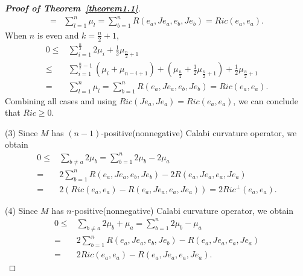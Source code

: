 \documentclass{amsart}
\theoremstyle{definition}
\theoremstyle{remark}
\numberwithin{equation}{section}
\begin{document}
\begin{proof}[{\bf Proof of Theorem~\ref{theorem1.1}}]
\begin{align*}
 = & \sum\limits_{l = 1}^n {{\mu _l}}  = \sum\limits_{b = 1}^n {R\left( {{e_a},J{e_a},{e_b},J{e_b}} \right)}
 =  Ric\left( {{e_a},{e_a}} \right).
\end{align*}
When $n$ is even and $k = \frac{n}{2}+1$,
\begin{align*}
0 \le & \sum\limits_{i = 1}^{\frac{n}{2}} {2{\mu _i}}  + \frac{1}{2}{\mu _{\frac{n}{2} + 1}}\\
 \le & \sum\limits_{i = 1}^{\frac{n}{2} - 1} {\left( {{\mu _i} + {\mu _{n - i + 1}}} \right)}  + \left( {{\mu _{\frac{n}{2}}} + \frac{1}{2}{\mu _{\frac{n}{2} + 1}}} \right) + \frac{1}{2}{\mu _{\frac{n}{2} + 1}}\\
 = & \sum\limits_{l = 1}^n {{\mu _l}}  = \sum\limits_{b = 1}^n {R\left( {{e_a},J{e_a},{e_b},J{e_b}} \right)}
 =  Ric\left( {{e_a},{e_a}} \right).
\end{align*}
Combining all cases and using   $Ric\left( {J{e_a},J{e_a}} \right) = Ric\left( {{e_a},{e_a}} \right)$, we can conclude that $Ric \ge 0$.

(3) Since $M$ has $\left( n-1 \right)$-positive(nonnegative) Calabi curvature operator, we obtain
\begin{align*}
0 \le & \sum\limits_{b \ne a}^{} {2{\mu _b}}
 = \sum\limits_{b = 1}^n {2{\mu _b}}  - 2{\mu _a}\\
 =& 2\sum\limits_{b = 1}^n {R\left( {{e_a},J{e_a},{e_b},J{e_b}} \right)}  - 2R\left( {{e_a},J{e_a},{e_a},J{e_a}} \right)\\
 =& 2\left( {Ric\left( {{e_a},{e_a}} \right) - R\left( {{e_a},J{e_a},{e_a},J{e_a}} \right)} \right)
 = 2Ri{c^ \bot }\left( {{e_a},{e_a}} \right) .
\end{align*}

(4) Since $M$ has $ n $-positive(nonnegative) Calabi curvature operator, we obtain
\begin{align*}
0 \le & \sum\limits_{b \ne a}^{} {2{\mu _b}}  + {\mu _a}
 =  \sum\limits_{b = 1}^n {2{\mu _b}}  - {\mu _a}\\
 = & 2\sum\limits_{b = 1}^n {R\left( {{e_a},J{e_a},{e_b},J{e_b}} \right)}  - R\left( {{e_a},J{e_a},{e_a},J{e_a}} \right)\\
 = & 2Ric\left( {{e_a},{e_a}} \right) - R\left( {{e_a},J{e_a},{e_a},J{e_a}} \right).
\end{align*}



\end{proof}
\end{document}
